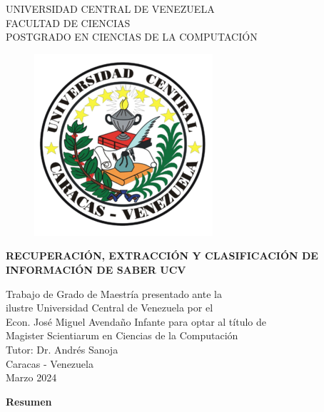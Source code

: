 \thispagestyle{empty}
\begin{center}
	UNIVERSIDAD CENTRAL DE VENEZUELA\\
	FACULTAD DE CIENCIAS\\
	POSTGRADO EN CIENCIAS DE LA COMPUTACI\'ON\\

	\begin{figure}
						\centering
						  \includegraphics[height=.7\textwidth]{images/UCV.png}
  \end{figure}
  \vspace{1.5cm}
  \large{\textbf{RECUPERACI\'ON, EXTRACCI\'ON Y CLASIFICACI\'ON DE \\ INFORMACI\'ON DE SABER UCV}}

  \vspace{3cm}
  Trabajo de Grado de Maestría presentado ante la \\
  ilustre Universidad Central de Venezuela por el\\
  Econ. José Miguel Avendaño Infante para  optar
  al título de \\Magister Scientiarum en Ciencias de la Computaci\'on\\
  \vspace{0.5cm}
  Tutor: Dr. Andrés Sanoja\\
  \vspace{1.5cm}
  Caracas - Venezuela\\
  Marzo 2024
\end{center}


\newpage
\thispagestyle{empty}
\large{\textbf{Resumen}}

